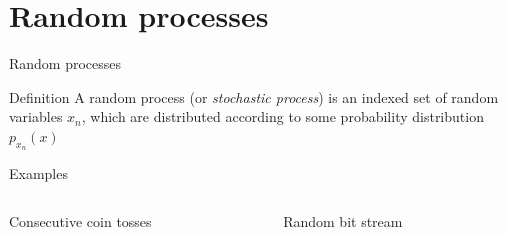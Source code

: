 \documentclass[10pt, handout]{beamer}
\begin{document}
\section{Random processes}
\begin{frame}{Random processes}

\begin{block}{Definition}
	A random process (or \textit{stochastic process}) is an indexed set of random variables $x_n$, which are distributed according to some probability distribution $p_{x_n}(x)$
\end{block}	

\begin{block}{Examples}
\begin{columns}
	\begin{column}{0.5\textwidth}
		Consecutive coin tosses
	\end{column}
	\begin{column}{0.5\textwidth}  %
		Random bit stream
	\end{column}
\end{columns}


\end{block}
\end{frame}
\end{document}
